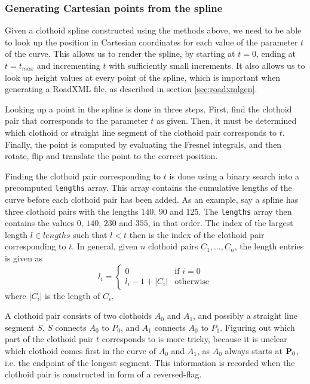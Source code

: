 \subsubsection{Generating Cartesian points from the spline}
Given a clothoid spline constructed using the methods above, we need to be able to look up the position in Cartesian coordinates for each value of the parameter $t$ of the curve. This allows us to render the spline, by starting at $t=0$, ending at $t=t_{max}$ and incrementing $t$ with sufficiently small increments. It also allows us to look up height values at every point of the spline, which is important when generating a RoadXML file, as described in section \ref{sec:roadxmlgen}.

Looking up a point in the spline is done in three steps. First, find the clothoid pair that corresponds to the parameter $t$ as given. Then, it must be determined which clothoid or straight line segment of the clothoid pair corresponds to $t$. Finally, the point is computed by evaluating the Fresnel integrals, and then rotate, flip and translate the point to the correct position.  

Finding the clothoid pair corresponding to $t$ is done using a binary search into a precomputed \texttt{lengths} array. This array contains the cumulative lengths of the curve before each clothoid pair has been added. As an example, say a spline has three clothoid pairs with the lengths $140$, $90$ and $125$. The \texttt{lengths} array then contains the values $0$, $140$, $230$ and $355$, in that order. The index of the largest length $l\in lengths$ such that $l < t$ then is the index of the clothoid pair corresponding to $t$. In general, given $n$ clothoid pairs $C_1, ..., C_n$, the length entries is given as
$$
l_i = 
\begin{cases}
0 & \mbox{if $i = 0$}\\
l_i-1+|C_i| & \mbox{otherwise}
\end{cases}
$$
where $|C_i|$ is the length of $C_i$.

A clothoid pair consists of two clothoids $A_0$ and $A_1$, and possibly a straight line segment $S$. $S$ connects $A_0$ to $P_0$, and $A_1$ connects $A_0$ to $P_1$. Figuring out which part of the clothoid pair $t$ corresponds to is more tricky, because it is unclear which clothoid comes first in the curve of $A_0$ and $A_1$, as $A_0$ always starts at ${\mathbf P}_0$, i.e. the endpoint of the longest segment. This information is recorded when the clothoid pair is constructed in form of a reversed-flag.

